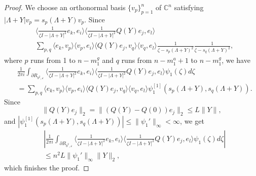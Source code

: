 \documentclass[10pt,a4paper]{amsart}
\newcommand{\C}{\mathbb{C}}
\newcommand{\inpr}[2]{\langle{#1,#2}\rangle}
\begin{document}
\begin{proof}
We choose an orthonormal basis $\{v_p\}_{p=1}^n$ of $\C^n$ satisfying $|\Lambda+Y|v_p=s_p(\Lambda+Y)v_p$. 
Since 
\begin{align*}
	&\inpr{\frac{1}{\zeta I-|\Lambda+Y|^2} e_k}{e_i}\inpr{\frac{1}{\zeta I-|\Lambda+Y|^2}Q(Y)e_j}{e_l} \\
	&\sum_{p,q}\inpr{e_k}{v_p}\inpr{v_p}{e_i}
	\inpr{Q(Y)e_j}{v_q}\inpr{v_q}{e_l}\frac{1}{\zeta-s_p(\Lambda+Y)^2}\frac{1}{\zeta-s_q(\Lambda+Y)^2},
\end{align*}
where $p$ runs from 1 to $n-m^g_1$ and $q$ runs from $n-m^a_1+1$ to $n-m^g_1$, we have 
\begin{align*}
	 &\frac{1}{2\pi i}\int_{\partial R_{b^2,\varepsilon}} \inpr{\frac{1}{\zeta I-|\Lambda+Y|^2} e_k}{e_i}\inpr{\frac{1}{\zeta I-|\Lambda+Y|^2}Q(Y)e_j}{e_l}	\psi_1(\zeta)d\zeta  \\
	&= \sum_{p,q}\inpr{e_k}{v_p}\inpr{v_p}{e_i}
	\inpr{Q(Y)e_j}{v_q}\inpr{v_q}{e_l}\psi_1^{[1]}(s_p(\Lambda+Y),s_q(\Lambda+Y)).
\end{align*} 
Since 
\[\|Q(Y)e_j\|_2=\|(Q(Y)-Q(0))e_j\|_2\leq L\|Y\|,\] 
and $|\psi_1^{[1]}(s_p(\Lambda+Y),s_q(\Lambda+Y))|\leq \|\psi_1'\|_\infty<\infty$, we get 
\begin{align*}
	&|\frac{1}{2\pi i}\int_{\partial R_{b^2,\varepsilon}} \inpr{\frac{1}{\zeta I-|\Lambda+Y|^2} e_k}{e_i}\inpr{\frac{1}{\zeta I-|\Lambda+Y|^2}Q(Y)e_j}{e_l}	\psi_1(\zeta)d\zeta|  \\
	&\leq  n^2L \|\psi_1'\|_\infty \|Y\|_2,
\end{align*} 
which finishes the proof. 
\end{proof}
\end{document}
